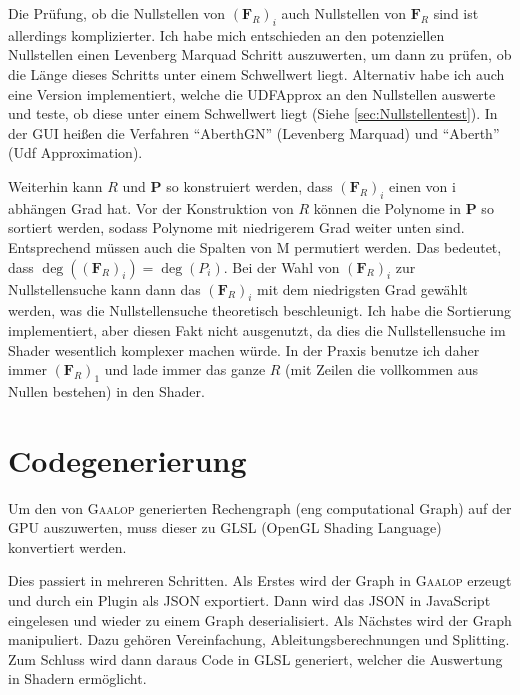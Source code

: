 \documentclass[
	ngerman,%
	accentcolor=9c,%
	ruledheaders=section,%
	class=report,%
	thesis={type=bachelor},%
	fontsize=11pt,%
	parskip=half-,%
	custommargins=true,%
	marginpar=false,%
]{tudapub}
\begin{document}
Die Prüfung, ob die Nullstellen von \((\mathbf{F}_R)_i\) auch Nullstellen von \(\mathbf{F}_R\) sind ist allerdings komplizierter. Ich habe mich entschieden an den potenziellen Nullstellen einen Levenberg Marquad Schritt auszuwerten, um dann zu prüfen, ob die Länge dieses Schritts unter einem Schwellwert liegt. Alternativ habe ich auch eine Version implementiert, welche die UDFApprox an den Nullstellen auswerte und teste, ob diese unter einem Schwellwert liegt (Siehe \ref{sec:Nullstellentest}). 
In der GUI heißen die Verfahren \enquote{AberthGN} (Levenberg Marquad) und \enquote{Aberth} (Udf Approximation).

Weiterhin kann \(R\) und \( \mathbf{P}\) so konstruiert werden, dass \((\mathbf{F}_R)_i\) einen von i abhängen Grad hat.
Vor der Konstruktion von \(R\) können die Polynome in \( \mathbf{P}\) so sortiert werden, sodass Polynome mit niedrigerem Grad weiter unten sind. Entsprechend müssen auch die Spalten von M permutiert werden.
Das bedeutet, dass \(\deg((\mathbf{F}_R)_i)=\deg(P_i)\). Bei der Wahl von \((\mathbf{F}_R)_i\) zur Nullstellensuche kann dann das \((\mathbf{F}_R)_i\) mit dem niedrigsten Grad gewählt werden, was die Nullstellensuche theoretisch beschleunigt.
Ich habe die Sortierung implementiert, aber diesen Fakt nicht ausgenutzt, da dies die Nullstellensuche im Shader wesentlich komplexer machen würde. In der Praxis benutze ich daher immer \((\mathbf{F}_R)_1\) und lade immer das ganze \(R\) (mit Zeilen die vollkommen aus Nullen bestehen) in den Shader.




\section{Codegenerierung}

Um den von \textsc{Gaalop} generierten Rechengraph (eng computational Graph) auf der GPU auszuwerten, muss dieser zu GLSL (OpenGL Shading Language) konvertiert werden.

Dies passiert in mehreren Schritten.
Als Erstes wird der Graph in \textsc{Gaalop} erzeugt und durch ein Plugin als JSON exportiert.
Dann wird das JSON in JavaScript eingelesen und wieder zu einem Graph deserialisiert.
Als Nächstes wird der Graph manipuliert. Dazu gehören Vereinfachung, Ableitungsberechnungen und Splitting.
Zum Schluss wird dann daraus Code in GLSL generiert, welcher die Auswertung in Shadern ermöglicht.
\end{document}

